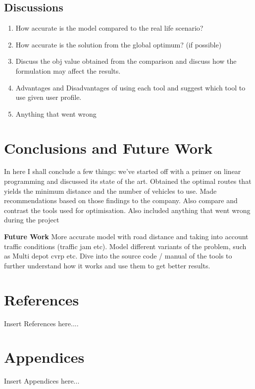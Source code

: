 \documentclass[a4paper, 12pt]{report}
\begin{document}
\section{Discussions}
\begin{enumerate}
\item How accurate is the model compared to the real life scenario?
\item How accurate is the solution from the global optimum? (if possible)
\item Discuss the obj value obtained from the comparison and discuss how the formulation may affect the results.
\item Advantages and Disadvantages of using each tool and suggest which tool to use given user profile.
\item Anything that went wrong
\end{enumerate}

\chapter{Conclusions and Future Work}
In here I shall conclude a few things: we've started off with a primer on linear programming and discussed its state
 of the art. Obtained the optimal routes that yields the minimum distance and the number of vehicles to use. Made
 recommendations based on those findings to the company. Also compare and contrast the tools used for optimisation. Also
 included anything that went wrong during the project

\textbf{Future Work}
More accurate model with road distance and taking into account traffic conditions (traffic jam etc). Model
 different variants of the problem, such as Multi depot cvrp etc. Dive into the source  code / manual of
 the tools to further understand how it works and use them to get better results.

\chapter{References}
Insert References here....

\chapter{Appendices}
Insert Appendices here...
\end{document}
